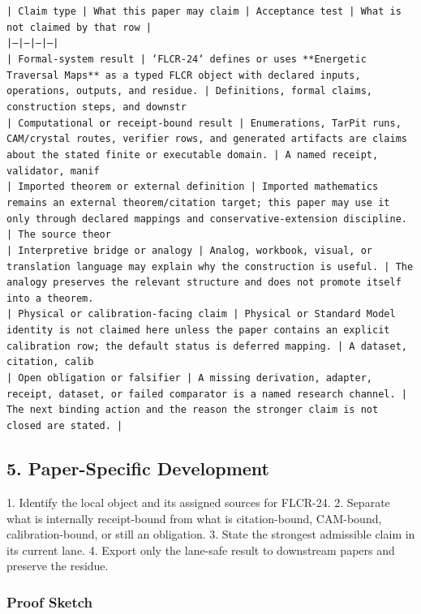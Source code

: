 \documentclass[11pt]{article}
\begin{document}
\noindent\texttt{| Claim type | What this paper may claim | Acceptance test | What is not claimed by that row |}\\
\noindent\texttt{|---|---|---|---|}\\
\noindent\texttt{| Formal-system result | `FLCR-24` defines or uses **Energetic Traversal Maps** as a typed FLCR object with declared inputs, operations, outputs, and residue. | Definitions, formal claims, construction steps, and downstr}\\
\noindent\texttt{| Computational or receipt-bound result | Enumerations, TarPit runs, CAM/crystal routes, verifier rows, and generated artifacts are claims about the stated finite or executable domain. | A named receipt, validator, manif}\\
\noindent\texttt{| Imported theorem or external definition | Imported mathematics remains an external theorem/citation target; this paper may use it only through declared mappings and conservative-extension discipline. | The source theor}\\
\noindent\texttt{| Interpretive bridge or analogy | Analog, workbook, visual, or translation language may explain why the construction is useful. | The analogy preserves the relevant structure and does not promote itself into a theorem. }\\
\noindent\texttt{| Physical or calibration-facing claim | Physical or Standard Model identity is not claimed here unless the paper contains an explicit calibration row; the default status is deferred mapping. | A dataset, citation, calib}\\
\noindent\texttt{| Open obligation or falsifier | A missing derivation, adapter, receipt, dataset, or failed comparator is a named research channel. | The next binding action and the reason the stronger claim is not closed are stated. | }\\

\subsection*{5. Paper-Specific Development}

1. Identify the local object and its assigned sources for FLCR-24.
2. Separate what is internally receipt-bound from what is citation-bound, CAM-bound, calibration-bound, or still an obligation.
3. State the strongest admissible claim in its current lane.
4. Export only the lane-safe result to downstream papers and preserve the residue.

\subsubsection*{Proof Sketch}
\end{document}

